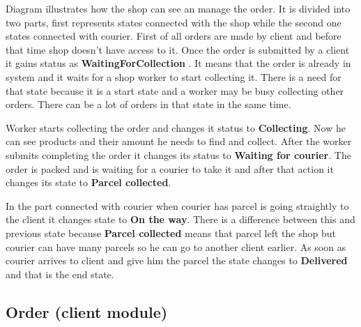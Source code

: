 \documentclass[../main.tex]{subfiles}
\begin{document}
\vspace{5mm}
Diagram illustrates how the shop can see an manage the order. It is divided into two parts, first represents states connected with the shop while the second one states connected with courier. First of all orders are made by client and before that time shop doesn't have access to it. Once the order is submitted by a client it gains status as \textbf{WaitingForCollection} . It means that the order is already in system and it waits for a shop worker to start collecting it. There is a need for that state because it is a start state and a worker may be busy collecting other orders. There can be a lot of orders in that state in the same time. 

Worker starts collecting the order and changes it status to  \textbf{Collecting}. Now he can see products and their amount he needs to find and collect. After the worker submits completing the order it changes its status to \textbf{Waiting for courier}. The order is packed and is waiting for a courier to take it and after that action it changes its state to \textbf{Parcel collected}.

In the part connected with courier when courier has parcel is going straightly to the client it changes state to \textbf{On the way}. There is a difference between this and previous state because \textbf{Parcel collected} means that parcel left the shop but courier can have many parcels so he can go to another client earlier. As soon as courier arrives to client and give him the parcel the state changes to \textbf{Delivered} and that is the end state.

\subsection{Order (client module)}
\vspace{5mm}
\end{document}
